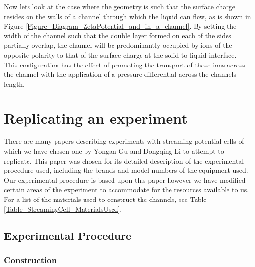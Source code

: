 Now lets look at the case where the geometry is such that the surface charge
resides on the walls of a channel through which the liquid can flow, as is
shown in Figure \ref{Figure_Diagram_ZetaPotential_and_in_a_channel}.  By
setting the width of the channel such that the double layer formed on each of
the sides partially overlap, the channel will be predominantly occupied by ions
of the opposite polarity to that of the surface charge at the solid to liquid
interface. This configuration has the effect of promoting the transport of
those ions across the channel with the application of a pressure differential
across the channels length.




\section{Replicating an experiment}

There are many papers describing experiments with streaming potential cells
\cite{Gu2000,Mala1997,Scales1992,VanderHeyden2006} of which we have chosen one
by Yongan Gu and Dongqing Li \cite{Gu2000} to attempt to replicate. This paper
was chosen for its detailed description of the experimental procedure used,
including the brands and model numbers of the equipment used. Our experimental
procedure is based upon this paper however we have modified certain areas of
the experiment to accommodate for the resources available to us. For a list of
the materials used to construct the channels, see Table
\ref{Table_StreamingCell_MaterialsUsed}.


\subsection{\label{sub:Experimental-Procedure}Experimental Procedure}


\subsubsection{Construction}

